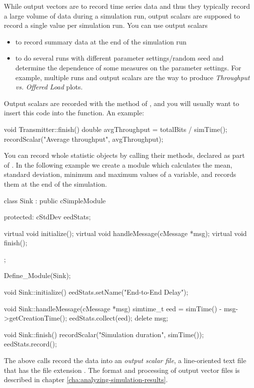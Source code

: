 While output vectors are to record time series data and thus they
typically record a large volume of data during a simulation run,
output scalars are supposed to record a single
value per simulation run. You can use output scalars

\begin{itemize}
\item{to record summary data at the end of the simulation run}
\item{to do several runs with different parameter settings/random seed
    and determine the dependence of some measures on the parameter
    settings. For example, multiple runs and output scalars are the
    way to produce \textit{Throughput vs. Offered Load} plots.}
\end{itemize}

Output scalars are recorded with the  method of
, and you will usually want to insert this code
into the  function. An example:

\begin{cpp}
void Transmitter::finish()
{
    double avgThroughput = totalBits / simTime();
    recordScalar("Average throughput", avgThroughput);
}
\end{cpp}

You can record whole statistic objects by calling their 
methods, declared as part of . In the following example
we create a  module which calculates the mean, standard
deviation, minimum and maximum values of a variable, and records them at the
end of the simulation.

\begin{cpp}
class Sink : public cSimpleModule
{
  protected:
    cStdDev eedStats;

    virtual void initialize();
    virtual void handleMessage(cMessage *msg);
    virtual void finish();
};

Define_Module(Sink);

void Sink::initialize()
{
    eedStats.setName("End-to-End Delay");
}

void Sink::handleMessage(cMessage *msg)
{
    simtime_t eed = simTime() - msg->getCreationTime();
    eedStats.collect(eed);
    delete msg;
}

void Sink::finish()
{
    recordScalar("Simulation duration", simTime());
    eedStats.record();
}
\end{cpp}

The above calls record the data into an \textit{output scalar file},
a line-oriented text file that has the file extension .
The format and processing of output vector files is described in chapter
\ref{cha:analyzing-simulation-results}.



